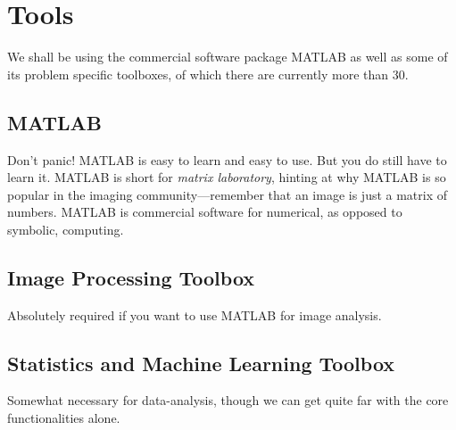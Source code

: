 \section{Tools}
We shall be using the commercial software package MATLAB as well as some of its problem specific toolboxes, of which there are currently more than 30.

\subsection{MATLAB}
Don't panic! MATLAB is easy to learn and easy to use. But you do still have to learn it.
MATLAB is short for \emph{matrix laboratory}, hinting at why MATLAB is so popular in the imaging community---remember that an image is just a matrix of numbers.
MATLAB is commercial software for numerical, as opposed to symbolic, computing.

\subsection{Image Processing Toolbox}
Absolutely required if you want to use MATLAB for image analysis.

\subsection{Statistics and Machine Learning Toolbox}
Somewhat necessary for data-analysis, though we can get quite far with the core functionalities alone.